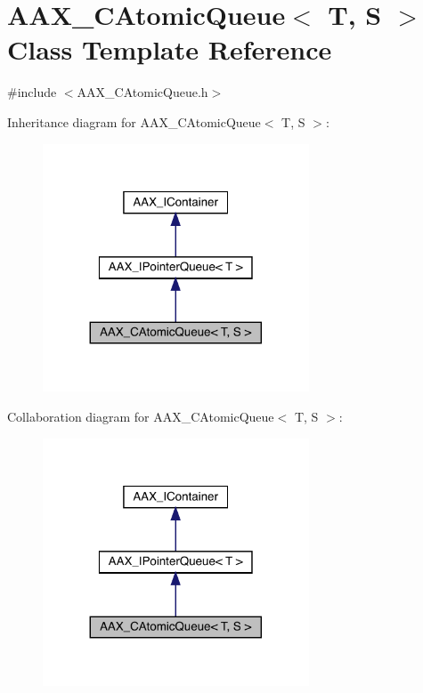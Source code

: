 \hypertarget{a01441}{}\section{A\+A\+X\+\_\+\+C\+Atomic\+Queue$<$ T, S $>$ Class Template Reference}
\label{a01441}


{\ttfamily \#include $<$A\+A\+X\+\_\+\+C\+Atomic\+Queue.\+h$>$}



Inheritance diagram for A\+A\+X\+\_\+\+C\+Atomic\+Queue$<$ T, S $>$\+:
\nopagebreak
\begin{figure}[H]
\begin{center}
\leavevmode
\includegraphics[width=224pt]{a01440}
\end{center}
\end{figure}


Collaboration diagram for A\+A\+X\+\_\+\+C\+Atomic\+Queue$<$ T, S $>$\+:
\nopagebreak
\begin{figure}[H]
\begin{center}
\leavevmode
\includegraphics[width=224pt]{a01439}
\end{center}
\end{figure}


